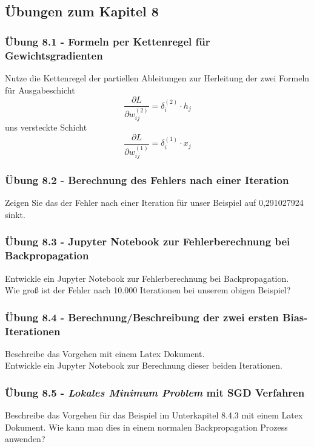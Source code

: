 \documentclass[12pt]{article}
\begin{document}
\newpage

\subsection{Übungen zum Kapitel 8}

\subsubsection{Übung 8.1 - Formeln per Kettenregel für Gewichtsgradienten}
Nutze die Kettenregel der partiellen Ableitungen zur Herleitung der zwei Formeln für Ausgabeschicht 
\[ \frac{\partial L}{\partial w^{(2)}_{ij}} = \delta^{(2)}_i \cdot h_j \] uns versteckte Schicht 
\[ \frac{\partial L}{\partial w^{(1)}_{ij}} = \delta^{(1)}_i \cdot x_j \] 

\subsubsection{Übung 8.2 - Berechnung des Fehlers nach einer Iteration}
Zeigen Sie das der Fehler nach einer Iteration für unser Beispiel auf 0,291027924 sinkt. 

\subsubsection{Übung 8.3 - Jupyter Notebook zur Fehlerberechnung bei Backpropagation}
Entwickle ein Jupyter Notebook zur Fehlerberechnung bei Backpropagation.\\ Wie groß ist der Fehler nach 10.000 Iterationen bei unserem obigen Beispiel?

\subsubsection{Übung 8.4 - Berechnung/Beschreibung der zwei ersten Bias-Iterationen}
Beschreibe das Vorgehen mit einem Latex Dokument.\\
Entwickle ein Jupyter Notebook zur Berechnung dieser beiden Iterationen.

\subsubsection{Übung 8.5 - \textit{Lokales Minimum Problem} mit SGD Verfahren}
Beschreibe das Vorgehen für das Beispiel im Unterkapitel 8.4.3 mit einem Latex Dokument. Wie kann man dies in einem normalen Backpropagation Prozess anwenden?

\newpage
\end{document}
